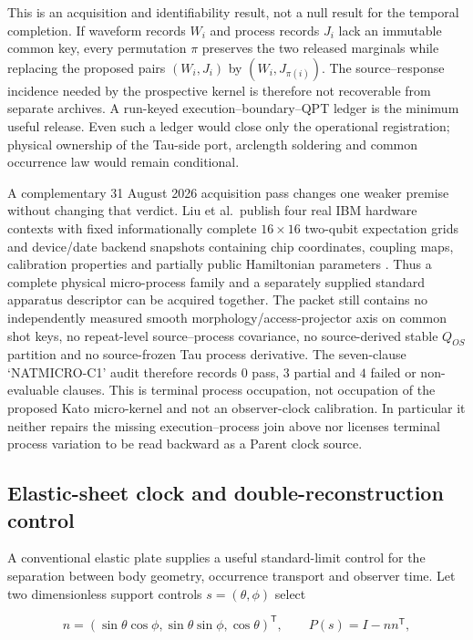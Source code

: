 \documentclass[11pt]{article}
\begin{document}
This is an acquisition and identifiability result, not a null result for the
temporal completion. If waveform records $W_i$ and process records $J_i$ lack
an immutable common key, every permutation $\pi$ preserves the two released
marginals while replacing the proposed pairs $(W_i,J_i)$ by
$(W_i,J_{\pi(i)})$. The source--response incidence needed by the prospective
kernel is therefore not recoverable from separate archives. A run-keyed
execution--boundary--QPT ledger is the minimum useful release. Even such a
ledger would close only the operational registration; physical ownership of
the Tau-side port, arclength soldering and common occurrence law would remain
conditional.

A complementary 31 August 2026 acquisition pass changes one weaker premise
without changing that verdict. Liu et al.\ publish four real IBM hardware
contexts with fixed informationally complete $16\times16$ two-qubit
expectation grids and device/date backend snapshots containing chip
coordinates, coupling maps, calibration properties and partially public
Hamiltonian parameters \cite{LiuRobustLindbladian2026,LiuLindbladianData2026}.
Thus a complete physical micro-process family and a separately supplied
standard apparatus descriptor can be acquired together. The packet still
contains no independently measured smooth morphology/access-projector axis on
common shot keys, no repeat-level source--process covariance, no source-derived
stable $Q_{OS}$ partition and no source-frozen Tau process derivative. The
seven-clause `NATMICRO-C1' audit therefore records $0$ pass, $3$ partial and
$4$ failed or non-evaluable clauses. This is terminal process occupation,
not occupation of the proposed Kato micro-kernel and not an observer-clock
calibration. In particular it neither repairs the missing
execution--process join above nor licenses terminal process variation to be
read backward as a Parent clock source.

\subsection{Elastic-sheet clock and double-reconstruction control}

A conventional elastic plate supplies a useful standard-limit control for
the separation between body geometry, occurrence transport and observer
time.  Let two dimensionless support controls \(s=(\theta,\phi)\) select

\begin{equation}
 n=(\sin\theta\cos\phi,\sin\theta\sin\phi,\cos\theta)^{\mathsf T},
 \qquad P(s)=I-nn^{\mathsf T},
 \label{eq:elastic-clock-projector}
\end{equation}
\end{document}
